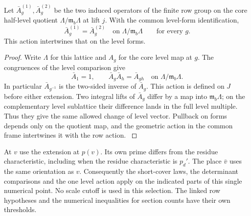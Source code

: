 \begin{lemma}
Let \(\bar A_g^{(1)},\bar A_g^{(2)}\) be the two induced operators of the finite row group on the core half-level quotient \(\Lambda/\mathfrak m_b\Lambda\) at lift \(j\). With the common level-form identification,
\[
 \bar A_g^{(1)}=\bar A_g^{(2)}\quad\text{on }\Lambda/\mathfrak m_b\Lambda\qquad\text{for every }g.
\]
This action intertwines that on the level forms.
\end{lemma}
\begin{proof}
Write \(\Lambda\) for this lattice and \(A_g\) for the core level
map at \(g\). The congruences of the level comparison give
\[
 \bar A_1=1,\qquad \bar A_g\bar A_h=\bar A_{gh}
       \quad\text{on }\Lambda/\mathfrak m_b\Lambda .
\]
In particular \(\bar A_{g^{-1}}\) is the two-sided inverse
of \(\bar A_g\). This action is defined on \(J\) before either
extension. Two integral lifts of \(\bar A_g\) differ by a map
into \(\mathfrak m_b\Lambda\); on the complementary level
sublattice their difference lands in the full level multiple.
Thus they give the same allowed change of level vector. Pullback
on forms depends only on the quotient map, and the geometric
action in the common frame intertwines it with the row action.
\label{cor:completed-division-9}
\end{proof}

At \(v\) use the extension at \(p(v)\). Its own prime
differs from the residue characteristic, including when
the residue characteristic is \(p_d'\). The place
\(\bar v\) uses the same orientation as \(v\).
Consequently the short-cover laws, the
determinant comparisons and the one level action apply
on the indicated parts of this single numerical point.
No scale cutoff is used in this selection. The linked row
hypotheses and the numerical inequalities for section counts
have their own thresholds.
\label{cor:completed-division-10}



